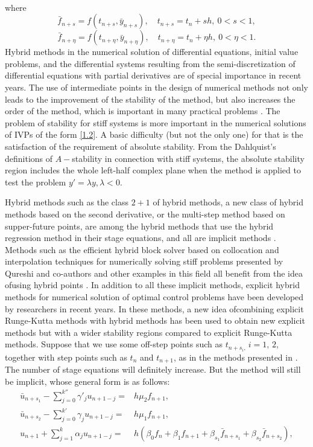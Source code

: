‎\documentclass[a4paper,10pt]{article}‎
\begin{document}
where
 $$ \bar{f}_{n+s}=f(t_{n+s},\bar{y}_{n+s}),\quad t_{n+s}=t_{n}+s h,\ 0<s<1,$$
  $$ \bar{f}_{n+\eta}=f(t_{n+\eta},\bar{y}_{n+\eta}),\quad t_{n+\eta}=t_{n}+\eta h,\ 0<\eta<1.$$
Hybrid methods in the numerical solution of differential equations, initial value problems, and the differential systems resulting from the semi-discretization of differential equations with partial derivatives are of special importance in recent years. The use of intermediate points in the design of numerical methods not only leads to the improvement of the stability of the method, but also increases the order of the method, which is important in many practical problems \cite{ALI6,ALI3,ALI5,ALI4,ALI2,ALI1}. 
The problem of stability for stiff systems is more important in the numerical solutions of IVPs of the form \eqref{1.2}. A basic difficulty (but not the only one) for that is the satisfaction of the requirement of absolute stability. From the Dahlquist's definitions of $A-$stability in connection with stiff systems,
the absolute stability region includes the whole  left-half complex plane  when the method is applied to test the problem $y'=\lambda y, \lambda <0$.
\\
\par
\noindent
Hybrid methods such as the class $2+1$ of hybrid methods, a new class of hybrid methods based on the second derivative, or the multi-step method based on supper-future points, are among the hybrid methods that use the hybrid regression method in their stage equations, and all are implicit methods
\cite{ALI6,ALI3,ALI2,ALI1}. Methods such as the efficient hybrid block solver based on collocation and interpolation techniques for numerically solving stiff problems presented by Qureshi and co-authors and other examples in this field all benefit from the idea of ​​using hybrid points \cite{Q24,R23}. In addition to all these implicit methods, explicit hybrid methods for numerical solution of optimal control problems have been developed by researchers in recent years\cite{OCP1, OCP2, OCP3}. In these methods, a new idea of ​​combining explicit Runge-Kutta methods with hybrid methods has been used to obtain new explicit methods but with a wider stability regions compared to explicit Runge-Kutta methods.
Suppose that we  use some off-step points such as $t_{n+s_{i},}\,i=1,\,2,$ together with step points such as $t_{n}$ and $t_{n+1}$,  as in the methods presented in \cite{ALI3,ALI5,ALI4,ALI2,ALI1}. The number of stage equations will definitely increase. But the method will still be implicit, whose general form is as follows:
\begin{align}
 \bar{u}_{n+s_{1}}-\sum_{j=0}^{k''}\gamma'_{j} u_{n+1-j}=& h \mu_{2} f_{n+1},\label{2.1}\\
 \bar{u}_{n+s_{2}}-\sum_{j=0}^{k'}\gamma_{j}u_{n+1-j}=& h\mu_{1} f_{n+1},\label{2.2}\\
u_{n+1}+\sum_{j=1}^{k}\alpha_{j}u_{n+1-j}= &  h(\beta_{0}f_{n}+\beta_{1}f_{n+1}+\beta_{s_{1}}\bar{f}_{n+s_{1}}+\beta_{s_{2}}\bar{f}_{n+s_{2}}), \label{2.3}
\end{align}
\end{document}
